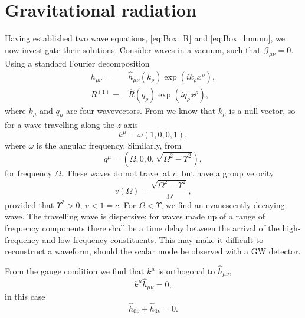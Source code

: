 \section{Gravitational radiation}\label{sec:Rad}

Having established two wave equations, \eqref{eq:Box_R} and \eqref{eq:Box_hmunu}, we now investigate their solutions. Consider waves in a vacuum, such that $\mathcal{G}_{\mu\nu} = 0$. Using a standard Fourier decomposition
\begin{subequations}
\begin{align}
\overline{h}_{\mu\nu} = {} & \widehat{h}_{\mu\nu}(k_\rho) \exp\left(ik_\rho x^\rho\right),\\
R^{(1)} = {} & \widehat{R}(q_\rho) \exp\left(iq_\rho x^\rho\right),
\end{align}
\end{subequations}
where $k_\mu$ and $q_\mu$ are four-wavevectors. From  we know that $k_\mu$ is a null vector, so for a wave travelling along the $z$-axis
\begin{equation}
k^\mu = \omega(1, 0, 0, 1),
\end{equation}
where $\omega$ is the angular frequency. Similarly, from 
\begin{equation}
q^\mu = \left(\Omega, 0, 0, \sqrt{\Omega^2 - \Upsilon^2}\right),
\label{eq:Ricci_q}
\end{equation}
for frequency $\Omega$. These waves do not travel at $c$, but have a group velocity
\begin{equation}
v(\Omega) = \dfrac{\sqrt{\Omega^2 - \Upsilon^2}}{\Omega},
\end{equation}
provided that $\Upsilon^2 > 0$, $v < 1 = c$. For $\Omega < \Upsilon$, we find an evanescently decaying wave. The travelling wave is dispersive; for waves made up of a range of frequency components there shall be a time delay between the arrival of the high-frequency and low-frequency constituents. This may make it difficult to reconstruct a waveform, should the scalar mode be observed with a GW detector.

From the gauge condition  we find that $k^\mu$ is orthogonal to $\widehat{h}_{\mu\nu}$,
\begin{equation}
k^\mu\widehat{h}_{\mu\nu} = 0,
\end{equation}
in this case
\begin{equation}
\widehat{h}_{0\nu} + \widehat{h}_{3\nu} = 0.
\label{eq:Transverse}
\end{equation}

